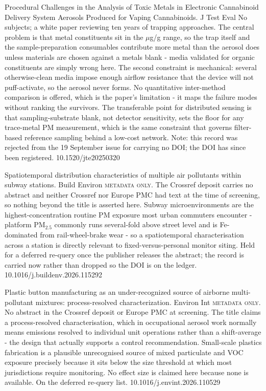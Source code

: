 \documentclass[10pt]{article}
\begin{document}

{Procedural Challenges in the Analysis of Toxic Metals in Electronic Cannabinoid Delivery System Aerosols Produced for Vaping Cannabinoids.}
{J Test Eval}
{No subjects; a white paper reviewing ten years of trapping approaches. The central problem is that metal constituents sit in the $\mu$g/g range, so the trap itself and the sample-preparation consumables contribute more metal than the aerosol does unless materials are chosen against a metals blank - media validated for organic constituents are simply wrong here. The second constraint is mechanical: several otherwise-clean media impose enough airflow resistance that the device will not puff-activate, so the aerosol never forms. No quantitative inter-method comparison is offered, which is the paper's limitation - it maps the failure modes without ranking the survivors. The transferable point for distributed sensing is that sampling-substrate blank, not detector sensitivity, sets the floor for any trace-metal PM measurement, which is the same constraint that governs filter-based reference sampling behind a low-cost network. Note: this record was rejected from the 19 September issue for carrying no DOI; the DOI has since been registered.}
{10.1520/jte20250320}


{Spatiotemporal distribution characteristics of multiple air pollutants within subway stations.}
{Build Environ}
{\textsc{metadata only.} The Crossref deposit carries no abstract and neither Crossref nor Europe PMC had text at the time of screening, so nothing beyond the title is asserted here. Subway microenvironments are the highest-concentration routine PM exposure most urban commuters encounter - platform PM$_{2.5}$ commonly runs several-fold above street level and is Fe-dominated from rail-wheel-brake wear - so a spatiotemporal characterisation across a station is directly relevant to fixed-versus-personal monitor siting. Held for a deferred re-query once the publisher releases the abstract; the record is carried now rather than dropped so the DOI is on the ledger.}
{10.1016/j.buildenv.2026.115292}

{Plastic button manufacturing as an under-recognized source of airborne multi-pollutant mixtures: process-resolved characterization.}
{Environ Int}
{\textsc{metadata only.} No abstract in the Crossref deposit or Europe PMC at screening. The title claims a process-resolved characterisation, which in occupational aerosol work normally means emissions resolved to individual unit operations rather than a shift-average - the design that actually supports a control recommendation. Small-scale plastics fabrication is a plausible unrecognised source of mixed particulate and VOC exposure precisely because it sits below the size threshold at which most jurisdictions require monitoring. No effect size is claimed here because none is available. On the deferred re-query list.}
{10.1016/j.envint.2026.110529}
\end{document}
